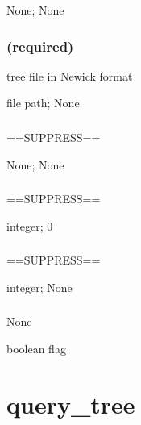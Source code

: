 \documentclass[letterpaper,12pt,english]{sphinxmanual}
\begin{document}
 None;  None


\subsubsection{ (required)}
\label{\detokenize{prog_desc:id4}}
 tree file in Newick format

 file path;  None


\subsubsection{}
\label{\detokenize{prog_desc:id5}}
 ==SUPPRESS==

 None;  None


\subsubsection{}
\label{\detokenize{prog_desc:startk}}
 ==SUPPRESS==

 integer;  0


\subsubsection{}
\label{\detokenize{prog_desc:stopk}}
 ==SUPPRESS==

 integer;  None


\subsubsection{}
\label{\detokenize{prog_desc:id6}}
 None

 boolean flag


\section{query\_tree}
\label{\detokenize{prog_desc:query-tree}}
\end{document}
